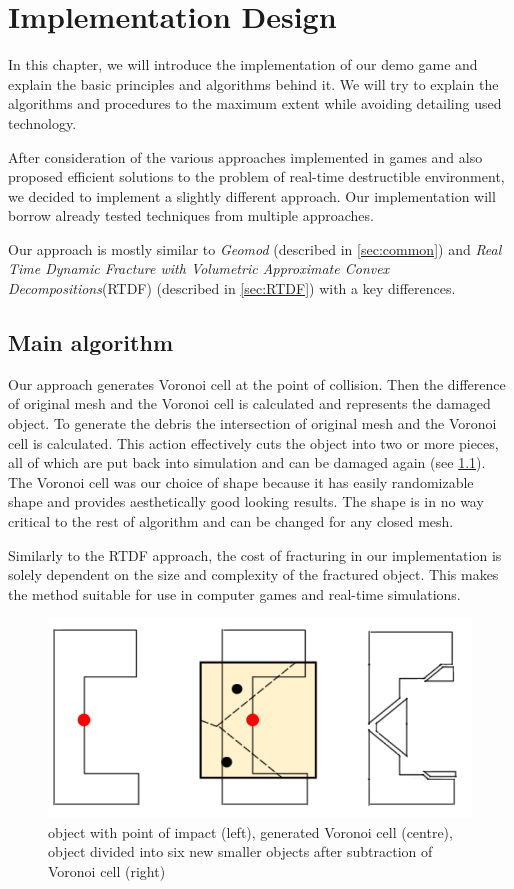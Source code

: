 \chapter{Implementation Design}
\label{chaptImplementation}
In this chapter, we will introduce the implementation of our demo game and explain the basic principles and algorithms behind it. We will try to explain the algorithms and procedures to the maximum extent while avoiding detailing used technology.

After consideration of the various approaches implemented in games and also proposed efficient solutions to the problem of real-time destructible environment, we decided to implement a slightly different approach. Our implementation will borrow already tested techniques from multiple approaches.

Our approach is mostly similar to \emph{Geomod} (described in \cref{sec:common}) and \emph{Real Time Dynamic Fracture
with Volumetric Approximate Convex Decompositions}(RTDF) (described in \cref{sec:RTDF}) with a key differences. 

\section{Main algorithm}
Our approach generates Voronoi cell at the point of collision. Then the difference of original mesh and the Voronoi cell is calculated and represents the damaged object. To generate the debris the intersection of original mesh and the Voronoi cell is calculated. This action effectively cuts the object into two or more pieces, all of which are put back into simulation and can be damaged again (see \cref{fig:subtraction}). The Voronoi cell was our choice of shape because it has easily randomizable shape and provides aesthetically good looking results. The shape is in no way critical to the rest of algorithm and can be changed for any closed mesh.

Similarly to the RTDF approach, the cost of fracturing in our implementation is solely dependent on the size and complexity of the fractured object.  This makes the method suitable for use in computer games and real-time simulations.

\begin{figure}
        \centering
        \includegraphics[width=\textwidth]{img/subtractionProcess}
        \caption{object with point of impact (left), generated Voronoi cell (centre), object divided into six new smaller objects after subtraction of Voronoi cell (right)}
        \label{fig:subtraction}
\end{figure}

